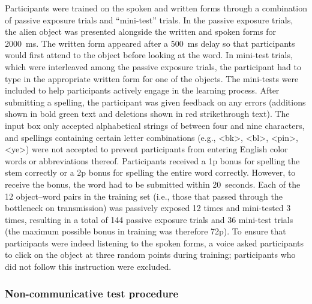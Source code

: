 \documentclass[doc,biblatex]{apa7}
\begin{document}
Participants were trained on the spoken and written forms through a combination of passive exposure trials and ``mini-test'' trials. In the passive exposure trials, the alien object was presented alongside the written and spoken forms for 2000~ms. The written form appeared after a 500~ms delay so that participants would first attend to the object before looking at the word. In mini-test trials, which were interleaved among the passive exposure trials, the participant had to type in the appropriate written form for one of the objects. The mini-tests were included to help participants actively engage in the learning process. After submitting a spelling, the participant was given feedback on any errors (additions shown in bold green text and deletions shown in red strikethrough text). The input box only accepted alphabetical strings of between four and nine characters, and spellings containing certain letter combinations (e.g., <bk>, <bl>, <pin>, <ye>) were not accepted to prevent participants from entering English color words or abbreviations thereof. Participants received a 1p bonus for spelling the stem correctly or a 2p bonus for spelling the entire word correctly. However, to receive the bonus, the word had to be submitted within 20~seconds. Each of the 12 object--word pairs in the training set (i.e., those that passed through the bottleneck on transmission) was passively exposed 12 times and mini-tested 3 times, resulting in a total of 144 passive exposure trials and 36 mini-test trials (the maximum possible bonus in training was therefore 72p). To ensure that participants were indeed listening to the spoken forms, a voice asked participants to click on the object at three random points during training; participants who did not follow this instruction were excluded.

\subsubsection{Non-communicative test procedure}
\end{document}
